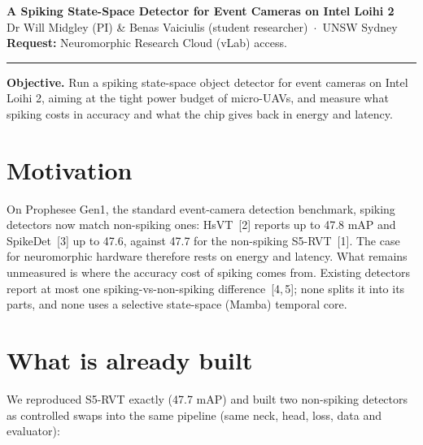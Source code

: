 \documentclass[11pt,a4paper]{article}
\begin{document}
\begin{center}
{\large\bfseries A Spiking State-Space Detector for Event Cameras on Intel Loihi 2}\\[3pt]
\small Dr Will Midgley (PI) \& Benas Vaiciulis (student researcher) \,$\cdot$\, UNSW Sydney\\[2pt]
\small\textbf{Request:} Neuromorphic Research Cloud (vLab) access.
\end{center}
\vspace{-2pt}
\hrule
\vspace{4pt}

\textbf{Objective.} Run a spiking state-space object detector for event cameras on Intel Loihi 2, aiming
at the tight power budget of micro-UAVs, and measure what spiking costs in accuracy and what the chip gives back in
energy and latency.

\section{Motivation}
On Prophesee Gen1, the standard event-camera detection benchmark, spiking detectors now match non-spiking ones:
HsVT~[2] reports up to 47.8 mAP and SpikeDet~[3] up to 47.6, against 47.7 for the non-spiking S5-RVT~[1]. The case
for neuromorphic hardware therefore rests on energy and latency. What remains unmeasured is where the
accuracy cost of spiking comes from. Existing detectors report at most one spiking-vs-non-spiking difference~[4,\,5];
none splits it into its parts, and none uses a selective state-space (Mamba) temporal core.

\section{What is already built}
We reproduced S5-RVT exactly (47.7 mAP) and built two non-spiking detectors as controlled swaps into the same
pipeline (same neck, head, loss, data and evaluator):
\end{document}
